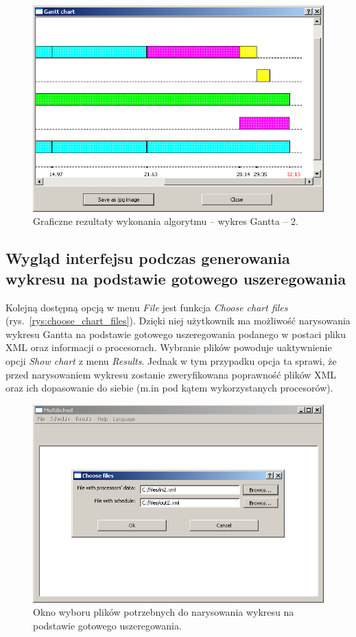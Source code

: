 \begin{figure}[htp]
\centering\includegraphics[scale=0.75]{figures/screens/chart_results2.png}
\caption{Graficzne rezultaty wykonania algorytmu -- wykres Gantta -- 2.}\label{rys:chart_results2}
\end{figure}

\subsection*{Wygląd interfejsu podczas generowania wykresu na podstawie gotowego uszeregowania}

Kolejną dostępną opcją w menu \emph{File} jest funkcja \emph{Choose chart files} (rys.~\vref{rys:choose_chart_files}). 
Dzięki niej użytkownik ma możliwość narysowania wykresu Gantta na podstawie gotowego uszeregowania podanego w postaci pliku XML oraz informacji o procesorach. 
Wybranie plików powoduje uaktywnienie opcji \emph{Show chart} z menu \emph{Results}. Jednak w tym przypadku opcja ta sprawi, że przed narysowaniem wykresu 
zostanie zweryfikowana poprawność plików XML oraz ich dopasowanie do siebie (m.in pod kątem wykorzystanych procesorów).

\begin{figure}[htp]
\centering\includegraphics[scale=0.8]{figures/screens/choose_chart_files.png}
\caption{Okno wyboru plików potrzebnych do narysowania wykresu na podstawie gotowego uszeregowania.}\label{rys:choose_chart_files}
\end{figure}

